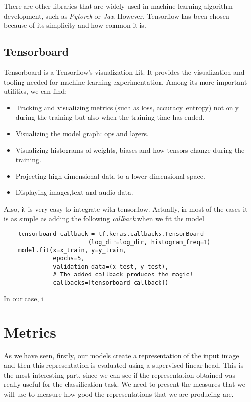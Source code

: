There are other libraries that are widely used in machine learning algorithm development, such as \emph{Pytorch} or \emph{Jax}. However, Tensorflow has been chosen because of its simplicity and how common it is. 

\subsection{Tensorboard}

Tensorboard is a Tensorflow's visualization kit. It provides the visualization and tooling needed for machine learning experimentation. Among its more important utilities, we can find:
\begin{itemize}
\item Tracking and visualizing metrics (such as loss, accuracy, entropy) not only during the training but also when the training time has ended.

\item Visualizing the model graph: ops and layers.

\item Visualizing histograms of weights, biases and how tensors change during the training.

\item Projecting high-dimensional data to a lower dimensional space.

\item Displaying images,text and audio data.
\end{itemize}

Also, it is very easy to integrate with tensorflow.  Actually, in most of the cases it is as simple as adding the following \emph{callback} when we fit the model:

\begin{verbatim}
    tensorboard_callback = tf.keras.callbacks.TensorBoard
                        (log_dir=log_dir, histogram_freq=1)
    model.fit(x=x_train, y=y_train, 
              epochs=5, 
              validation_data=(x_test, y_test),
              # The added callback produces the magic! 
              callbacks=[tensorboard_callback])  
\end{verbatim}

In our case, i

\section{Metrics}

As we have seen, firstly, our models create a representation of the input image and then this representation is evaluated using a supervised linear head. This is the most interesting part, since we can see if the representation obtained was really useful for the classification task. We need to present the measures that we will use to measure how good the representations that we are producing are.



